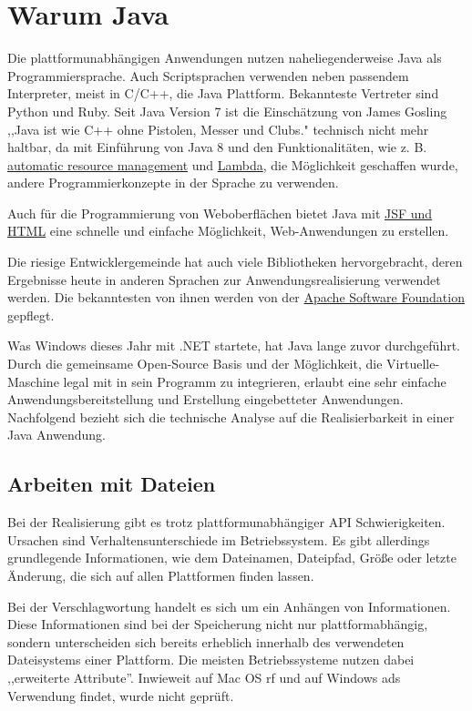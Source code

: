 \documentclass[oneside, ngerman, toc=bibliography,bibliography=totoc,listof=entryprefix, open=right,numbers=noenddot,fontsize=12pt]{scrbook}
\begin{document}
\section{Warum Java}
Die plattformunabhängigen Anwendungen nutzen naheliegenderweise Java als Programmiersprache. Auch Scriptsprachen verwenden neben passendem Interpreter, meist in C/C++, die Java Plattform. Bekannteste Vertreter sind Python und Ruby.
Seit Java Version 7 ist die Einschätzung von James Gosling ,,Java ist wie C++ ohne Pistolen, Messer und Clubs." technisch nicht mehr haltbar, da mit Einführung von Java 8 und den Funktionalitäten, wie z. B.  \href{http://www.oracle.com/technetwork/articles/java/trywithresources-401775.html}{automatic resource management} und \href{http://www.oracle.com/technetwork/articles/java/rich-client-lambdas-2227138.html}{Lambda}, die Möglichkeit geschaffen wurde, andere Programmierkonzepte in der Sprache zu verwenden.

Auch für die Programmierung von Weboberflächen bietet Java mit \href{http://www.oracle.com/technetwork/articles/java/enterprise-html5-2227136.html}{JSF und HTML} eine schnelle und einfache Möglichkeit, Web-Anwendungen zu erstellen.

Die riesige Entwicklergemeinde hat auch viele Bibliotheken hervorgebracht, deren Ergebnisse heute in anderen Sprachen zur Anwendungsrealisierung verwendet werden. Die bekanntesten von ihnen werden von der
\href{http://www.apache.org/}{ Apache Software Foundation } gepflegt.


Was Windows dieses Jahr mit {.NET} startete, hat Java lange zuvor durchgeführt. Durch die gemeinsame Open-Source Basis und der Möglichkeit, die Virtuelle-Maschine legal mit in sein Programm zu integrieren, erlaubt eine sehr einfache Anwendungsbereitstellung und Erstellung eingebetteter Anwendungen. Nachfolgend bezieht sich die technische Analyse auf die Realisierbarkeit in einer Java Anwendung.


\subsection{Arbeiten mit Dateien}
Bei der Realisierung gibt es trotz plattformunabhängiger API Schwierigkeiten. Ursachen sind Verhaltensunterschiede im Betriebssystem.
Es gibt allerdings grundlegende Informationen, wie dem Dateinamen, Dateipfad, Größe oder letzte Änderung, die sich auf allen Plattformen finden lassen.

Bei der Verschlagwortung handelt es sich um ein Anhängen von Informationen. Diese Informationen sind bei der Speicherung nicht nur plattformabhängig, sondern unterscheiden sich bereits erheblich innerhalb des verwendeten Dateisystems einer Plattform.
Die meisten Betriebssysteme nutzen dabei ,,erweiterte Attribute''. Inwieweit auf Mac OS \acrshort{rf} und auf Windows \acrshort{ads} Verwendung findet, wurde nicht geprüft.  
 
\end{document}
